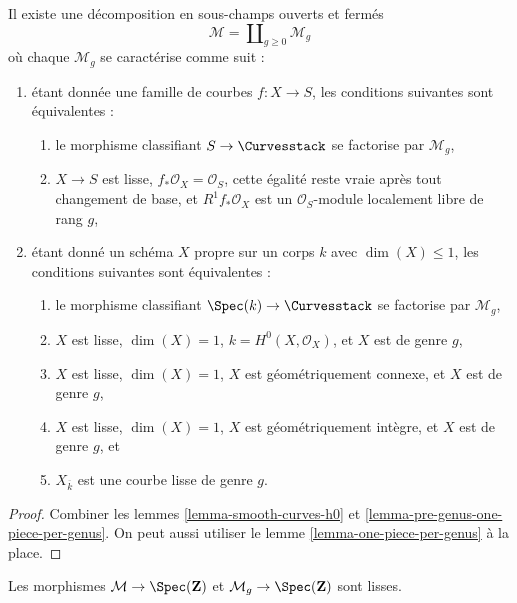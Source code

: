 \begin{lemma}
\label{lemma-smooth-one-piece-per-genus}
Il existe une décomposition en sous-champs ouverts et fermés
$$
\mathcal{M} = \coprod\nolimits_{g \geq 0} \mathcal{M}_g
$$
où chaque $\mathcal{M}_g$ se caractérise comme suit :
\begin{enumerate}
\item étant donnée une famille de courbes $f : X \to S$, les conditions suivantes sont équivalentes :
\begin{enumerate}
\item le morphisme classifiant $S \to \Curvesstack$ se factorise
par $\mathcal{M}_g$,
\item $X \to S$ est lisse, $f_*\mathcal{O}_X = \mathcal{O}_S$,
cette égalité reste vraie après tout changement de base, et $R^1f_*\mathcal{O}_X$
est un $\mathcal{O}_S$-module localement libre de rang $g$,
\end{enumerate}
\item étant donné un schéma $X$ propre sur un corps $k$ avec
$\dim(X) \leq 1$, les conditions suivantes sont équivalentes :
\begin{enumerate}
\item le morphisme classifiant $\Spec(k) \to \Curvesstack$ se factorise
par $\mathcal{M}_g$,
\item $X$ est lisse, $\dim(X) = 1$, $k = H^0(X, \mathcal{O}_X)$,
et $X$ est de genre $g$,
\item $X$ est lisse, $\dim(X) = 1$, $X$ est géométriquement connexe, et
$X$ est de genre $g$,
\item $X$ est lisse, $\dim(X) = 1$, $X$ est géométriquement intègre, et
$X$ est de genre $g$, et
\item $X_{\overline{k}}$ est une courbe lisse de genre $g$.
\end{enumerate}
\end{enumerate}
\end{lemma}

\begin{proof}
Combiner les lemmes \ref{lemma-smooth-curves-h0} et
\ref{lemma-pre-genus-one-piece-per-genus}.
On peut aussi utiliser
le lemme \ref{lemma-one-piece-per-genus}
à la place.
\end{proof}

\begin{lemma}
\label{lemma-smooth-curves-h0-smooth}
Les morphismes $\mathcal{M} \to \Spec(\mathbf{Z})$ et
$\mathcal{M}_g \to \Spec(\mathbf{Z})$
sont lisses.
\end{lemma}

